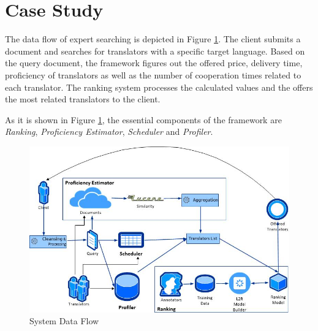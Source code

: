 \section{Case Study}
\label{sec:casestudy}
The data flow of expert searching is depicted in Figure \ref{fig:architecture}. The client submits a document and searches for translators with a specific target language. Based on the query document, the framework figures out the offered price, delivery time, proficiency of translators as well as the number of cooperation times related to each translator. The ranking system processes the calculated values and the offers the most related translators to the client.

As it is shown in Figure \ref{fig:architecture}, the essential components of the framework are \textit{Ranking}, \textit{Proficiency Estimator}, \textit{Scheduler} and \textit{Profiler}.

\begin{figure}[h]
\begin{center}
\includegraphics[scale=0.8]{figures/dataflow.jpg}
\caption{System Data Flow
\label{fig:architecture}}
\end{center}
\end{figure}

